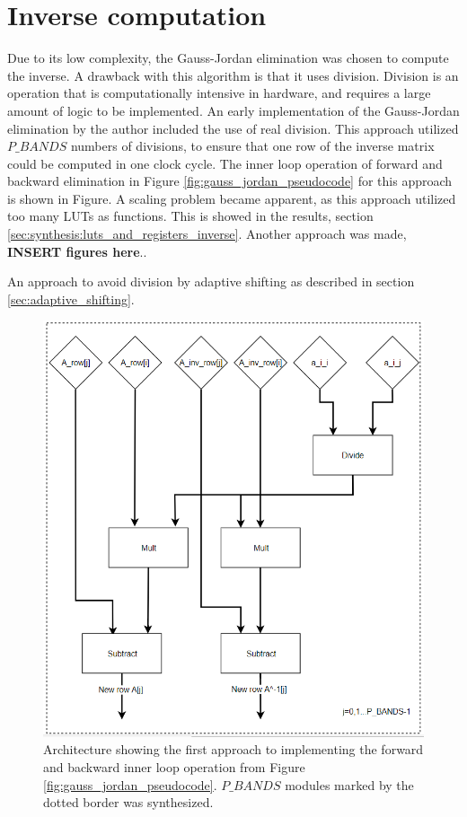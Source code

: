 \section{Inverse computation}
\label{sec:inverse_computation_hw}
Due to its low complexity, the Gauss-Jordan elimination was chosen to compute the inverse. A drawback with this algorithm is that it uses division. Division is an operation that is computationally intensive in hardware, and requires a large amount of logic to be implemented. An early implementation of the Gauss-Jordan elimination by the author included the use of real division. This approach utilized $P\_BANDS$ numbers of divisions, to ensure that one row of the inverse matrix could be computed in one clock cycle. The inner loop operation of forward and backward elimination in Figure \ref{fig:gauss_jordan_pseudocode} for this approach is shown in Figure.  A scaling problem became apparent, as this approach utilized too many LUTs as functions.  This is showed in the results, section \ref{sec:synthesis:luts_and_registers_inverse}. 
Another approach was made, \textbf{INSERT figures here}..

An approach to avoid division by adaptive shifting as described in section \ref{sec:adaptive_shifting}. 

\begin{figure}[H]
\centering
   \includegraphics[scale=0.5]{images/inverse_approach_P_BANDS_divisions/inverse_core_old_approach.PNG}
  \caption{Architecture showing the first approach to implementing the forward and backward inner loop operation from Figure \ref{fig:gauss_jordan_pseudocode}. $P\_BANDS$ modules marked by the dotted border was synthesized.  } 
  \label{fig:inverse_P_BANDS_number_of_divisions}
\end{figure}


